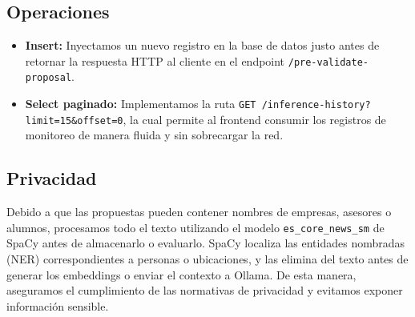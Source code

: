 \subsection{Operaciones}

\begin{itemize}
  \item \textbf{Insert:} Inyectamos un nuevo registro en la base de datos justo antes de retornar la respuesta HTTP al cliente en el endpoint \texttt{/pre-validate-proposal}.
  \item \textbf{Select paginado:} Implementamos la ruta \texttt{GET /inference-history?limit=15\&offset=0}, la cual permite al frontend consumir los registros de monitoreo de manera fluida y sin sobrecargar la red.
\end{itemize}

\subsection{Privacidad}

Debido a que las propuestas pueden contener nombres de empresas, asesores o alumnos, procesamos todo el texto utilizando el modelo \texttt{es\_core\_news\_sm} de SpaCy antes de almacenarlo o evaluarlo. SpaCy localiza las entidades nombradas (NER) correspondientes a personas o ubicaciones, y las elimina del texto antes de generar los embeddings o enviar el contexto a Ollama. De esta manera, aseguramos el cumplimiento de las normativas de privacidad y evitamos exponer información sensible.
